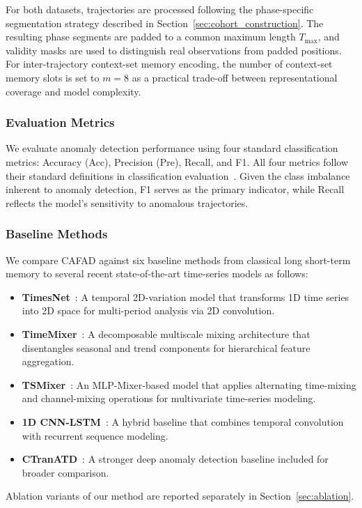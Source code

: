 \documentclass[iicol,pdflatex,sn-basic,Numbered]{sn-jnl}%
\theoremstyle{thmstyleone}%
\theoremstyle{thmstyletwo}%
\theoremstyle{thmstylethree}%
\begin{document}
For both datasets, trajectories are processed following the phase-specific segmentation strategy described in Section~\ref{sec:cohort_construction}.
The resulting phase segments are padded to a common maximum length $T_{\max}$, and validity masks are used to distinguish real observations from padded positions.
For inter-trajectory context-set memory encoding, the number of context-set memory slots is set to $m = 8$ as a practical trade-off between representational coverage and model complexity.


\subsubsection{Evaluation Metrics}
\label{sec:metrics}

We evaluate anomaly detection performance using four standard classification metrics: Accuracy (Acc), Precision (Pre), Recall, and F1.
All four metrics follow their standard definitions in classification evaluation~\cite{powers2020evaluation}.
Given the class imbalance inherent to anomaly detection, F1 serves as the primary indicator, while Recall reflects the model's sensitivity to anomalous trajectories.


\subsubsection{Baseline Methods}

We compare CAFAD against six baseline methods from classical long short-term memory to several recent state-of-the-art time-series models as follows:
\begin{itemize}
\item \textbf{TimesNet}~\cite{wu2023timesnet}: A temporal 2D-variation model that transforms 1D time series into 2D space for multi-period analysis via 2D convolution.
\item \textbf{TimeMixer}~\cite{wang2024timemixer}: A decomposable multiscale mixing architecture that disentangles seasonal and trend components for hierarchical feature aggregation.
\item \textbf{TSMixer}~\cite{chen2023tsmixer}: An MLP-Mixer-based model that applies alternating time-mixing and channel-mixing operations for multivariate time-series modeling.
\item \textbf{1D CNN-LSTM}~\cite{yang2024data}: A hybrid baseline that combines temporal convolution with recurrent sequence modeling.
\item \textbf{CTranATD}~\cite{Han2025CNNTransformerBA}: A stronger deep anomaly detection baseline included for broader comparison.
\end{itemize}
Ablation variants of our method are reported separately in Section~\ref{sec:ablation}.
\end{document}
